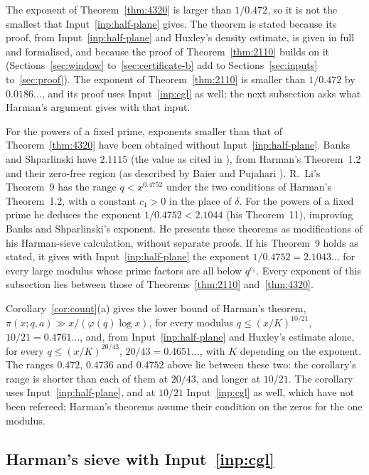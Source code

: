 \documentclass[11pt]{article}
\theoremstyle{definition}
\begin{document}
The exponent of Theorem~\ref{thm:4320} is larger than $1/0.472$, so it is not the smallest that
Input~\ref{inp:half-plane} gives. The theorem is stated because its proof, from Input~\ref{inp:half-plane} and
Huxley's density estimate, is given in full and formalised, and because the proof of Theorem~\ref{thm:2110} builds
on it (Sections~\ref{sec:window} to~\ref{sec:certificate-b} add to Sections~\ref{sec:inputs} to~\ref{sec:proof}).
The exponent of Theorem~\ref{thm:2110} is smaller than $1/0.472$ by $0.0186\ldots$, and its proof uses
Input~\ref{inp:cgl} as well; the next subsection asks what Harman's argument gives with that input.

For the powers of a fixed prime, exponents smaller than that of Theorem~\ref{thm:4320} have been obtained without
Input~\ref{inp:half-plane}. Banks and Shparlinski \cite{banks-shparlinski} have $2.1115$ (the value as cited in
\cite[footnote~1]{cgl}), from Harman's Theorem~1.2 and their zero-free region (as described by Baier and Pujahari
\cite{baier-pujahari}). R.~Li's Theorem~9 \cite{li-harman} has the range $q < x^{0.4752}$ under the two conditions
of Harman's Theorem~1.2, with a constant $c_1 > 0$ in the place of $\delta$. For the powers of a fixed prime he
deduces the exponent $1/0.4752 < 2.1044$ (his Theorem~11),
improving Banks and Shparlinski's exponent. He presents these theorems as modifications of his Harman-sieve
calculation, without separate proofs. If his Theorem~9 holds as stated, it gives with Input~\ref{inp:half-plane} the
exponent $1/0.4752 = 2.1043\ldots$ for every large modulus whose prime factors are all below $q^{c_1}$. Every
exponent of this subsection lies between those of Theorems~\ref{thm:2110} and~\ref{thm:4320}.

Corollary~\ref{cor:count}(a) gives the lower bound of Harman's theorem, $\pi(x; q, a) \gg x/(\varphi(q) \log x)$,
for every modulus $q \le (x/K)^{10/21}$, $10/21 = 0.4761\ldots$, and, from Input~\ref{inp:half-plane} and Huxley's
estimate alone, for every $q \le (x/K)^{20/43}$, $20/43 = 0.4651\ldots$, with $K$ depending on the exponent. The
ranges $0.472$, $0.4736$ and $0.4752$ above lie between these two: the corollary's range is shorter than each of
them at $20/43$, and longer at $10/21$. The corollary uses Input~\ref{inp:half-plane}, and at $10/21$
Input~\ref{inp:cgl} as well, which have not been refereed; Harman's theorems assume their condition on the zeros
for the one modulus.

\subsection*{Harman's sieve with Input~\ref{inp:cgl}}
\end{document}
